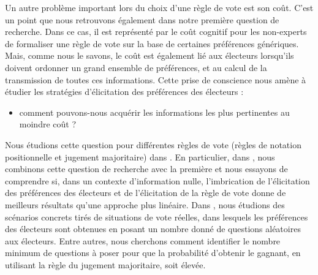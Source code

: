 	Un autre problème important lors du choix d'une règle de vote est son coût. C'est un point que nous retrouvons également dans notre première question de recherche. 
	Dans ce cas, il est représenté par le coût cognitif pour les non-experts de formaliser une règle de vote sur la base de certaines préférences génériques. Mais, comme nous le savons, le coût est également lié aux électeurs lorsqu'ils doivent ordonner un grand ensemble de préférences, et au calcul de la transmission de toutes ces informations.
	Cette prise de conscience nous amène à étudier les stratégies d'élicitation des préférences des électeurs :
	\begin{itemize}
		\item comment pouvons-nous acquérir les informations les plus pertinentes au moindre coût ?
	\end{itemize}
	Nous étudions cette question pour différentes règles de vote (règles de notation positionnelle et jugement majoritaire) dans . En particulier, dans , nous combinons cette question de recherche avec la première et nous essayons de comprendre si, dans un contexte d'information nulle, l'imbrication de l'élicitation des préférences des électeurs et de l'élicitation de la règle de vote donne de meilleurs résultats qu'une approche plus linéaire. 
	Dans , nous étudions des scénarios concrets tirés de situations de vote réelles, dans lesquels les préférences des électeurs sont obtenues en posant un nombre donné de questions aléatoires aux électeurs. Entre autres, nous cherchons comment identifier le nombre minimum de questions à poser pour que la probabilité d'obtenir le gagnant, en utilisant la règle du jugement majoritaire, soit élevée.
	
